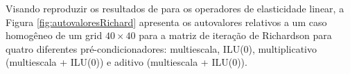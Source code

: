Visando reproduzir os resultados de \cite{zhouiterativo} para os operadores de elasticidade linear, a Figura \ref{fig:autovaloresRichard} apresenta os autovalores relativos a um caso homogêneo de um grid $40\times40$ para a matriz de iteração de Richardson para quatro diferentes pré-condicionadores: multiescala, ILU(0), multiplicativo (multiescala + ILU(0)) e aditivo (multiescala + ILU(0)).


\begin{figure}[h]
\center
{}
\qquad
{}


\end{figure}
